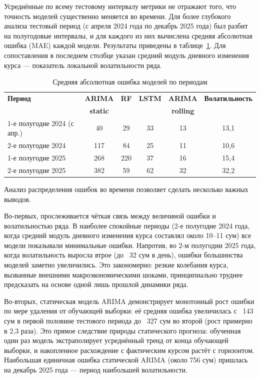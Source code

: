 Усреднённые по всему тестовому интервалу метрики не отражают того, что точность моделей существенно меняется во времени. Для более глубокого анализа тестовый период (с апреля 2024 года по декабрь 2025 года) был разбит на полугодовые интервалы, и для каждого из них вычислена средняя абсолютная ошибка (MAE) каждой модели. Результаты приведены в таблице~\ref{tab:errors_by_period}. Для сопоставления в последнем столбце указан средний модуль дневного изменения курса — показатель локальной волатильности ряда.

\begin{table}[h!]
\centering
\caption{Средняя абсолютная ошибка моделей по периодам}
\label{tab:errors_by_period}
\begin{tabular}{|l|c|c|c|c|c|}
\hline
\textbf{Период} &
\textbf{ARIMA} &
\textbf{RF} &
\textbf{LSTM} &
\textbf{ARIMA} &
\textbf{Волатильность} \\
&
\textbf{static} &
&
&
\textbf{rolling} &
\\
\hline

1-е полугодие 2024 (с апр.) &
40 &
29 &
33 &
13 &
13{,}1 \\
\hline

2-е полугодие 2024 &
117 &
84 &
25 &
11 &
10{,}6 \\
\hline

1-е полугодие 2025 &
268 &
220 &
37 &
16 &
15{,}4 \\
\hline

2-е полугодие 2025 &
382 &
59 &
62 &
32 &
32{,}2 \\
\hline

\end{tabular}
\end{table}

Анализ распределения ошибок во времени позволяет сделать несколько важных выводов.

Во-первых, прослеживается чёткая связь между величиной ошибки и волатильностью ряда. В наиболее спокойные периоды (2-е полугодие 2024 года, когда средний модуль дневного изменения курса составлял около 10--11 сум) все модели показывали минимальные ошибки. Напротив, во 2-м полугодии 2025 года, когда волатильность выросла втрое (до ~32 сум в день), ошибки большинства моделей заметно увеличились. Это закономерно: резкие колебания курса, вызванные внешними макроэкономическими шоками, принципиально труднее предсказать на основе одной лишь прошлой динамики ряда.

Во-вторых, статическая модель ARIMA демонстрирует монотонный рост ошибки по мере удаления от обучающей выборки: её средняя ошибка увеличилась с ~143 сум в первой половине тестового периода до ~327 сум во второй (рост примерно в 2,3 раза). Это прямое следствие природы статического прогноза: обученная один раз модель экстраполирует усреднённый тренд от конца обучающей выборки, и накопленное расхождение с фактическим курсом растёт с горизонтом. Наибольшая единичная ошибка статической ARIMA (около 756 сум) пришлась на декабрь 2025 года — период наибольшей волатильности.

